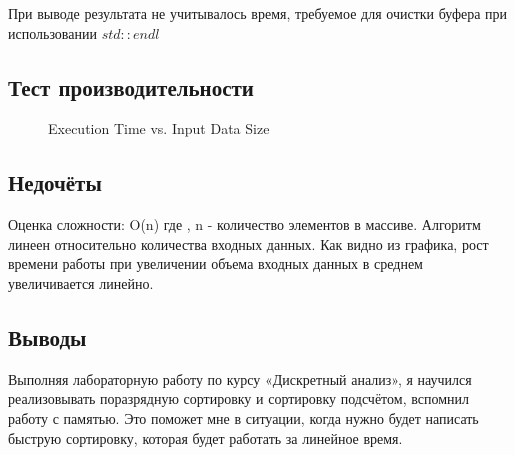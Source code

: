 \documentclass[12pt]{article}
\begin{document}
При выводе результата не учитывалось время, требуемое для очистки буфера при использовании 
$std::endl$

\subsection*{Тест производительности}

\begin{figure}
\centering
{}
\caption{Execution Time vs. Input Data Size}
\end{figure}

\subsection*{Недочёты}

Оценка сложности: O(n) где , n - количество элементов в массиве.
Алгоритм линеен относительно количества входных данных.
Как видно из графика, рост времени работы при увеличении объема входных данных
в среднем увеличивается линейно.

\subsection*{Выводы}

Выполняя лабораторную работу по курсу «Дискретный анализ», я научился реализовывать 
поразрядную сортировку и сортировку подсчётом,
вспомнил работу с памятью. Это поможет мне в ситуации, когда нужно будет написать
быструю сортировку, которая будет работать за линейное время. 
\end{document}
